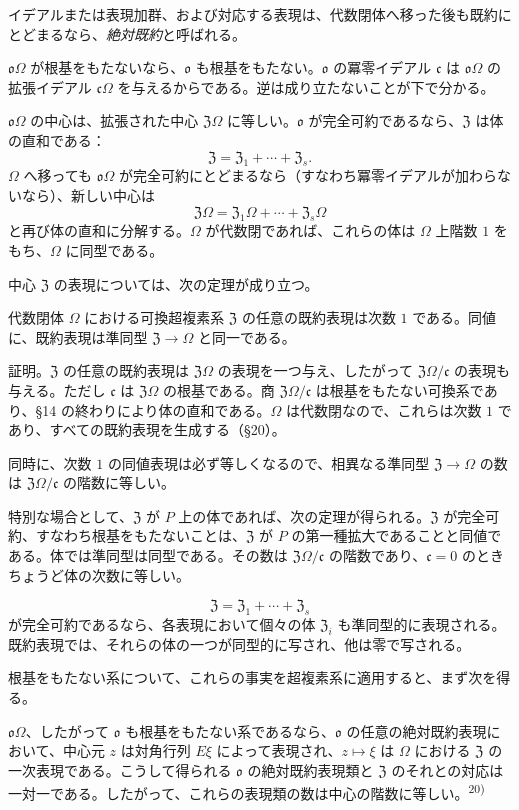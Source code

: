 \documentclass[11pt]{article}
\providecommand{\mo}{\mathfrak{o}}
\providecommand{\mc}{\mathfrak{c}}
\providecommand{\mZ}{\mathfrak{Z}}
\begin{document}
イデアルまたは表現加群、および対応する表現は、代数閉体へ移った後も既約にとどまるなら、\emph{絶対既約}と呼ばれる。

$\mo\Omega$ が根基をもたないなら、$\mo$ も根基をもたない。$\mo$ の冪零イデアル $\mc$ は $\mo\Omega$ の拡張イデアル $\mc\Omega$ を与えるからである。逆は成り立たないことが下で分かる。

$\mo\Omega$ の中心は、拡張された中心 $\mZ\Omega$ に等しい。$\mo$ が完全可約であるなら、$\mZ$ は体の直和である：
\[
        \mZ=\mZ_1+\cdots+\mZ_s.
\]
$\Omega$ へ移っても $\mo\Omega$ が完全可約にとどまるなら（すなわち冪零イデアルが加わらないなら）、新しい中心は
\[
        \mZ\Omega=\mZ_1\Omega+\cdots+\mZ_s\Omega
\]
と再び体の直和に分解する。$\Omega$ が代数閉であれば、これらの体は $\Omega$ 上階数 $1$ をもち、$\Omega$ に同型である。

中心 $\mZ$ の表現については、次の定理が成り立つ。

代数閉体 $\Omega$ における可換超複素系 $\mZ$ の任意の既約表現は次数 $1$ である。同値に、既約表現は準同型 $\mZ\to\Omega$ と同一である。

証明。$\mZ$ の任意の既約表現は $\mZ\Omega$ の表現を一つ与え、したがって $\mZ\Omega/\mc$ の表現も与える。ただし $\mc$ は $\mZ\Omega$ の根基である。商 $\mZ\Omega/\mc$ は根基をもたない可換系であり、§14 の終わりにより体の直和である。$\Omega$ は代数閉なので、これらは次数 $1$ であり、すべての既約表現を生成する（§20）。

同時に、次数 $1$ の同値表現は必ず等しくなるので、相異なる準同型 $\mZ\to\Omega$ の数は $\mZ\Omega/\mc$ の階数に等しい。

特別な場合として、$\mZ$ が $P$ 上の体であれば、次の定理が得られる。$\mZ$ が完全可約、すなわち根基をもたないことは、$\mZ$ が $P$ の第一種拡大であることと同値である。体では準同型は同型である。その数は $\mZ\Omega/\mc$ の階数であり、$\mc=0$ のときちょうど体の次数に等しい。

\[
        \mZ=\mZ_1+\cdots+\mZ_s
\]
が完全可約であるなら、各表現において個々の体 $\mZ_i$ も準同型的に表現される。既約表現では、それらの体の一つが同型的に写され、他は零で写される。

根基をもたない系について、これらの事実を超複素系に適用すると、まず次を得る。

$\mo\Omega$、したがって $\mo$ も根基をもたない系であるなら、$\mo$ の任意の絶対既約表現において、中心元 $z$ は対角行列 $E\xi$ によって表現され、$z\mapsto \xi$ は $\Omega$ における $\mZ$ の一次表現である。こうして得られる $\mo$ の絶対既約表現類と $\mZ$ のそれとの対応は一対一である。したがって、これらの表現類の数は中心の階数に等しい。\textsuperscript{20)}
\end{document}
